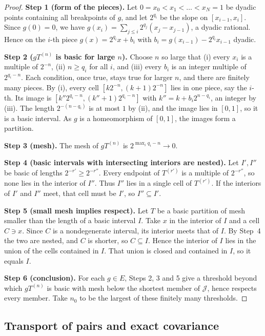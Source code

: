 \documentclass[11pt]{article}
\theoremstyle{definition}
\numberwithin{equation}{section}
\newcommand{\step}[1]{\par\smallskip\noindent\textbf{Step #1.}\enspace}
\begin{document}
\begin{proof}
\step{1 (form of the pieces)}
Let \(0=x_0<x_1<\dots<x_N=1\) be dyadic points containing all breakpoints
of \(g\), and let \(2^{q_i}\) be the slope on \([x_{i-1},x_i]\). Since
\(g(0)=0\), we have \(g(x_i)=\sum_{j\le i}2^{q_j}(x_j-x_{j-1})\), a dyadic
rational. Hence on the \(i\)-th piece \(g(x)=2^{q_i}x+b_i\) with
\(b_i=g(x_{i-1})-2^{q_i}x_{i-1}\) dyadic.

\step{2 (\(gT^{(n)}\) is basic for large \(n\))}
Choose \(n\) so large that (i) every \(x_i\) is a multiple of \(2^{-n}\),
(ii) \(n\ge q_i\) for all \(i\), and (iii) every \(b_i\) is an integer
multiple of \(2^{q_i-n}\). Each condition, once true, stays true for
larger \(n\), and there are finitely many pieces. By (i), every cell
\([k2^{-n},(k+1)2^{-n}]\) lies in one piece, say the \(i\)-th. Its image is
\([k''2^{q_i-n},(k''+1)2^{q_i-n}]\) with \(k''=k+b_i2^{n-q_i}\), an integer
by (iii). The length \(2^{-(n-q_i)}\) is at most \(1\) by (ii), and the
image lies in \([0,1]\), so it is a basic interval. As \(g\) is a
homeomorphism of \([0,1]\), the images form a partition.

\step{3 (mesh)}
The mesh of \(gT^{(n)}\) is \(2^{\max_iq_i-n}\to0\).

\step{4 (basic intervals with intersecting interiors are nested)}
Let \(I',I''\) be basic of lengths \(2^{-r'}\ge2^{-r''}\). Every endpoint of
\(T^{(r')}\) is a multiple of \(2^{-r''}\), so none lies in the interior of
\(I''\). Thus \(I''\) lies in a single cell of \(T^{(r')}\). If the
interiors of \(I'\) and \(I''\) meet, that cell must be \(I'\), so
\(I''\subseteq I'\).

\step{5 (small mesh implies respect)}
Let \(T\) be a basic partition of mesh smaller than the length of a basic
interval \(I\). Take \(x\) in the interior of \(I\) and a cell \(C\ni x\).
Since \(C\) is a nondegenerate interval, its interior meets that of \(I\).
By Step~4 the two are nested, and \(C\) is shorter, so \(C\subseteq I\).
Hence the interior of \(I\) lies in the union of the cells contained in
\(I\). That union is closed and contained in \(I\), so it equals \(I\).

\step{6 (conclusion)}
For each \(g\in E\), Steps 2, 3 and 5 give a threshold beyond which
\(gT^{(n)}\) is basic with mesh below the shortest member of
\(\mathcal J\), hence respects every member. Take \(n_0\) to be the largest
of these finitely many thresholds.
\end{proof}

\subsection{Transport of pairs and exact covariance}
\end{document}
